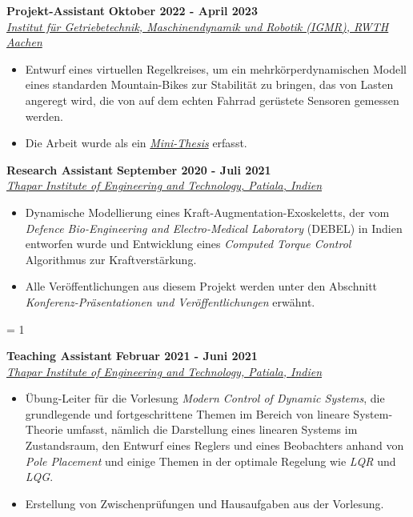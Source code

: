 \vspace{0.1 in}

\large{\textbf{Projekt-Assistant}}
\hfill
\large{\textbf{Oktober 2022 - April 2023}}\\
\href{https://www.igmr.rwth-aachen.de/cms/~jkhpl/igmr/}{\large{\emph{Institut für Getriebetechnik, Maschinendynamik und Robotik (IGMR), RWTH Aachen}}}
\begin{itemize}
	\item \large{Entwurf eines virtuellen Regelkreises, um ein mehrkörperdynamischen Modell eines standarden Mountain-Bikes zur Stabilität zu bringen, das von Lasten angeregt wird, die von auf dem echten Fahrrad gerüstete Sensoren gemessen werden.}
	\item\large{Die Arbeit wurde als ein \href{https://average-engineer.github.io/Projects-Website-Ashutosh-Mukherjee/Resources/MiniThesis.pdf}{\large{\textit{Mini-Thesis}}} erfasst.}
\end{itemize}

\vspace{0.1 in}

\large{\textbf{Research Assistant}}
\hfill
\large{\textbf{September 2020 - Juli 2021}}\\
\href{https://www.thapar.edu/}{\large{\emph{Thapar Institute of Engineering and Technology, Patiala, Indien}}}
\begin{itemize}
	\item\large{Dynamische Modellierung eines Kraft-Augmentation-Exoskeletts, der vom \emph{Defence Bio-Engineering and Electro-Medical Laboratory} (DEBEL) in Indien entworfen wurde und Entwicklung eines \emph{Computed Torque Control} Algorithmus zur Kraftverstärkung.}
	\item\large{Alle Veröffentlichungen aus diesem Projekt werden unter den Abschnitt \emph{Konferenz-Präsentationen und Veröffentlichungen} erwähnt.}
\end{itemize}

\ifnum\teach = 1
	\vspace{0.1 in}

	\large{\textbf{Teaching Assistant}}
	\hfill
	\large{\textbf{Februar 2021 - Juni 2021}}\\
	\href{https://www.thapar.edu/}{\large{\emph{Thapar Institute of Engineering and Technology, Patiala, Indien}}}
	\begin{itemize}
		\item Übung-Leiter für die Vorlesung \emph{Modern Control of Dynamic Systems}, die grundlegende und fortgeschrittene Themen im Bereich von lineare System-Theorie umfasst, nämlich die Darstellung eines linearen Systems im Zustandsraum, den Entwurf eines Reglers und eines Beobachters anhand von \emph{Pole Placement} und einige Themen in der optimale Regelung wie \emph{LQR} und \emph{LQG}.
		\item Erstellung von Zwischenprüfungen und Hausaufgaben aus der Vorlesung.
	\end{itemize}
\fi



